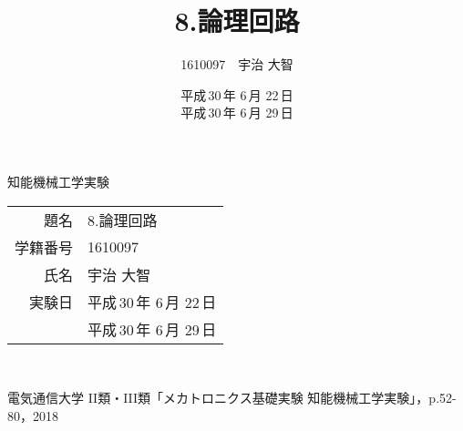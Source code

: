 \documentclass[a4paper,uplatex]{jsarticle}
\begin{document}
\begin{titlepage}
\begin{center}
\vspace*{12pt}
{\huge 知能機械工学実験}
\vspace{12pt}\\
{\LARGE
\begin{tabular}{rl}
題名&8.論理回路\\
学籍番号&1610097\\
氏名&宇治 大智\\
実験日&平成\,30\,年 6\,月 22\,日\\
&平成\,30\,年 6\,月 29\,日
\end{tabular}\\
}
\end{center}
\end{titlepage}


\title{8.論理回路}
\author{1610097　宇治 大智}
\date{平成\,30\,年 6\,月 22\,日\\平成\,30\,年 6\,月 29\,日}
\maketitle

%
%


%
%




%
%


%
%
\begin{thebibliography}{9}
	 電気通信大学 II類・III類「メカトロニクス基礎実験 知能機械工学実験」，p.52-80，2018
\end{thebibliography}


\end{document}
